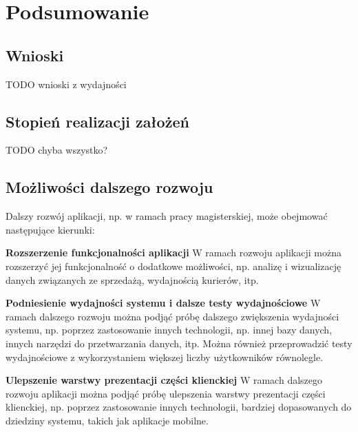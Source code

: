 \clearpage %

\section{Podsumowanie}

\subsection{Wnioski}

TODO wnioski z wydajności

\subsection{Stopień realizacji założeń}

TODO chyba wszystko?

\subsection{Możliwości dalszego rozwoju}

Dalszy rozwój aplikacji, np. w ramach pracy magisterskiej, może obejmować następujące kierunki:

\textbf{Rozszerzenie funkcjonalności aplikacji} W ramach rozwoju aplikacji można rozszerzyć jej funkcjonalność o dodatkowe możliwości, np. analizę i wizualizację danych związanych ze sprzedażą, wydajnością kurierów, itp.

\textbf{Podniesienie wydajności systemu i dalsze testy wydajnościowe} W ramach dalszego rozwoju można podjąć próbę dalszego zwiększenia wydajności systemu, np. poprzez zastosowanie innych technologii, np. innej bazy danych, innych narzędzi do przetwarzania danych, itp. Można również przeprowadzić testy wydajnościowe z wykorzystaniem większej liczby użytkowników równolegle.

\textbf{Ulepszenie warstwy prezentacji części klienckiej} W ramach dalszego rozwoju aplikacji można podjąć próbę ulepszenia warstwy prezentacji części klienckiej, np. poprzez zastosowanie innych technologii, bardziej dopasowanych do dziedziny systemu, takich jak aplikacje mobilne. 